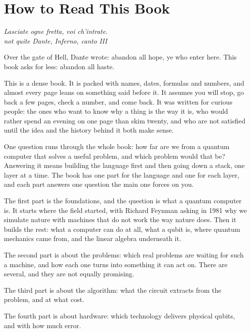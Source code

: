 \chapter*{How to Read This Book}

\begin{flushright}
\itshape Lasciate ogne fretta, voi ch'intrate.\\[2pt]
\upshape\small not quite Dante, \emph{Inferno}, canto III
\end{flushright}

Over the gate of Hell, Dante wrote: abandon all hope, ye who enter here. This book asks
for less: abandon all haste.

This is a dense book. It is packed with names, dates, formulas and numbers, and almost
every page leans on something said before it. It assumes you will stop, go back a few
pages, check a number, and come back. It was written for curious people: the ones who
want to know why a thing is the way it is, who would rather spend an evening on one page
than skim twenty, and who are not satisfied until the idea and the history behind it
both make sense.

One question runs through the whole book: how far are we from a quantum computer
that solves a useful problem, and which problem would that be? Answering it means
building the language first and then going down a stack, one layer at a time. The
book has one part for the language and one for each layer, and each part answers one
question the main one forces on you.

The first part is the foundations, and the question is what a quantum computer is.
It starts where the field started, with Richard Feynman asking in 1981 why we
simulate nature with machines that do not work the way nature does. Then it builds
the rest: what a computer can do at all, what a qubit is, where quantum mechanics
came from, and the linear algebra underneath it.

The second part is about the problems: which real problems are waiting for such a
machine, and how each one turns into something it can act on. There are several, and
they are not equally promising.

The third part is about the algorithm: what the circuit extracts from the problem,
and at what cost.

The fourth part is about hardware: which technology delivers physical qubits, and
with how much error.

